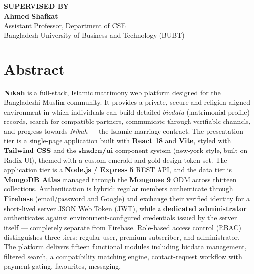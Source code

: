 \documentclass[12pt,a4paper]{report}
\begin{document}
\begin{titlepage}
\vspace{2cm}

\begin{center}
    \textbf{SUPERVISED BY}\\[2ex]
    \textbf{Ahmed Shafkat}\\
    Assistant Professor, Department of CSE\\
    Bangladesh University of Business and Technology (BUBT)
\end{center}
\end{titlepage}


\chapter*{Abstract}
\noindent
\textbf{Nikah} is a full-stack, Islamic matrimony web platform designed for the
Bangladeshi Muslim community. It provides a private, secure and
religion-aligned environment in which individuals can build detailed
\emph{biodata} (matrimonial profile) records, search for compatible partners,
communicate through verifiable channels, and progress towards \emph{Nikah} ---
the Islamic marriage contract. The presentation tier is a single-page
application built with \textbf{React 18} and \textbf{Vite}, styled with
\textbf{Tailwind CSS} and the \textbf{shadcn/ui} component system (new-york
style, built on Radix UI), themed with a custom emerald-and-gold design token
set. The application tier is a \textbf{Node.js / Express 5} REST API, and the
data tier is \textbf{MongoDB Atlas} managed through the \textbf{Mongoose 9}
ODM across thirteen collections. Authentication is hybrid: regular members
authenticate through \textbf{Firebase} (email/password and Google) and exchange
their verified identity for a short-lived server JSON Web Token (JWT), while a
\textbf{dedicated administrator} authenticates against environment-configured
credentials issued by the server itself --- completely separate from Firebase.
Role-based access control (RBAC) distinguishes three tiers: regular user,
premium subscriber, and administrator. The platform delivers fifteen functional
modules including biodata management, filtered search, a compatibility matching
engine, contact-request workflow with payment gating, favourites, messaging,
\end{document}
